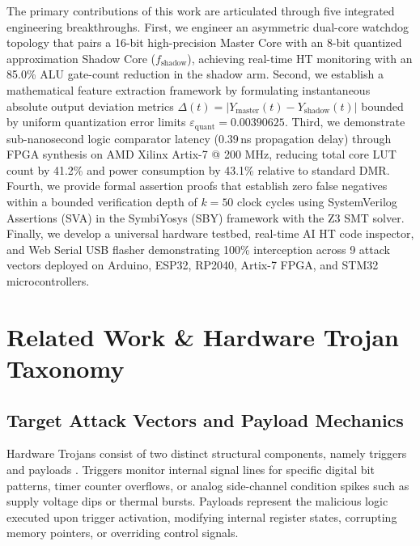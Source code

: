 \documentclass[conference]{IEEEtran}
\begin{document}
The primary contributions of this work are articulated through five integrated engineering breakthroughs. First, we engineer an asymmetric dual-core watchdog topology that pairs a 16-bit high-precision Master Core with an 8-bit quantized approximation Shadow Core ($f_{\text{shadow}}$), achieving real-time HT monitoring with an 85.0\% ALU gate-count reduction in the shadow arm. Second, we establish a mathematical feature extraction framework by formulating instantaneous absolute output deviation metrics $\Delta(t) = |Y_{\text{master}}(t) - Y_{\text{shadow}}(t)|$ bounded by uniform quantization error limits $\varepsilon_{\text{quant}} = 0.00390625$. Third, we demonstrate sub-nanosecond logic comparator latency ($0.39$\,ns propagation delay) through FPGA synthesis on AMD Xilinx Artix-7 @ 200 MHz, reducing total core LUT count by 41.2\% and power consumption by 43.1\% relative to standard DMR. Fourth, we provide formal assertion proofs that establish zero false negatives within a bounded verification depth of $k=50$ clock cycles using SystemVerilog Assertions (SVA) in the SymbiYosys (SBY) framework with the Z3 SMT solver. Finally, we develop a universal hardware testbed, real-time AI HT code inspector, and Web Serial USB flasher demonstrating 100\% interception across 9 attack vectors deployed on Arduino, ESP32, RP2040, Artix-7 FPGA, and STM32 microcontrollers.

\section{Related Work \& Hardware Trojan Taxonomy}

\subsection{Target Attack Vectors and Payload Mechanics}
Hardware Trojans consist of two distinct structural components, namely triggers and payloads \cite{zhang2011case}. Triggers monitor internal signal lines for specific digital bit patterns, timer counter overflows, or analog side-channel condition spikes such as supply voltage dips or thermal bursts. Payloads represent the malicious logic executed upon trigger activation, modifying internal register states, corrupting memory pointers, or overriding control signals.
\end{document}
